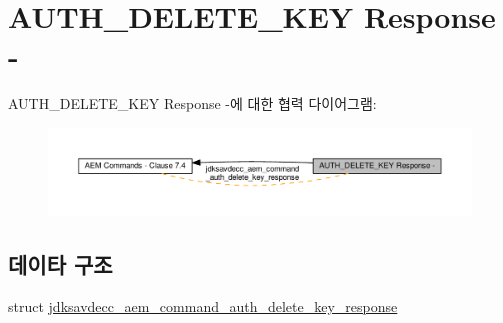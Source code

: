 \hypertarget{group__command__auth__delete__key__response}{}\section{A\+U\+T\+H\+\_\+\+D\+E\+L\+E\+T\+E\+\_\+\+K\+EY Response -\/}
\label{group__command__auth__delete__key__response}
A\+U\+T\+H\+\_\+\+D\+E\+L\+E\+T\+E\+\_\+\+K\+EY Response -\/에 대한 협력 다이어그램\+:
\nopagebreak
\begin{figure}[H]
\begin{center}
\leavevmode
\includegraphics[width=350pt]{group__command__auth__delete__key__response}
\end{center}
\end{figure}
\subsection*{데이타 구조}
\begin{DoxyCompactItemize}
\item 
struct \hyperlink{structjdksavdecc__aem__command__auth__delete__key__response}{jdksavdecc\+\_\+aem\+\_\+command\+\_\+auth\+\_\+delete\+\_\+key\+\_\+response}
\end{DoxyCompactItemize}
